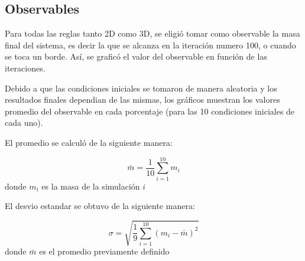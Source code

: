\subsection{Observables}
Para todas las reglas tanto 2D como 3D, se eligió tomar como observable la masa final del sistema, es decir la que se alcanza en la iteración numero 100, o cuando se toca un borde.
Así, se graficó el valor del observable en función de las iteraciones.

Debido a que las condiciones iniciales se tomaron de manera aleatoria y los resultados finales dependian de las mismas, los gráficos muestran los valores promedio del observable en cada porcentaje (para las 10 condiciones iniciales de cada uno).

El promedio se calculó de la siguiente manera:

\begin{equation}
    \label{eq:mean}
    \bar{m} = \frac{1}{10} \sum_{i=1}^{10} m_i
\end{equation}
donde $m_i$ es la masa de la simulación $i$

El desvio estandar se obtuvo de la siguiente manera:

\begin{equation}
    \label{eq:std}
    \sigma = \sqrt{\frac{1}{9} \sum_{i=1}^{10} (m_i - \bar{m})^2}
\end{equation}
donde $\bar{m}$ es el promedio previamente definido